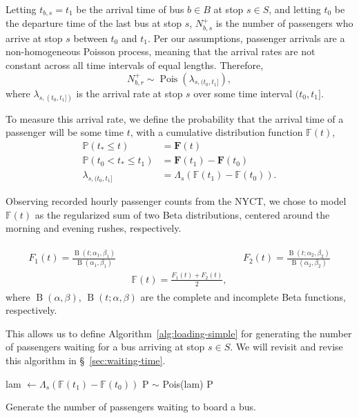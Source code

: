 \documentclass[12pt]{article}
\theoremstyle{definition}
\newcommand{\Prob}{\mathbb P}
\DeclareMathOperator{\Pois}{Pois}
\DeclareMathOperator{\B}{B}
\begin{document}
Letting $t_{b,s} = t_1$ be the arrival time of bus $b \in B$ at stop $s \in
S$, and letting $t_0$ be the departure time of the last bus at stop $s$,
$N^+_{b,s}$ is the number of passengers who arrive at stop $s$ between $t_0$
and $t_1$. Per our assumptions, passenger arrivals are a non-homogeneous
Poisson process, meaning that the arrival rates are not constant across all
time intervals of equal lengths. Therefore,
\[
    N^+_{b,r} \sim \Pois\left(\lambda_{s, (t_0, t_1]}\right),
\]
where $\lambda_{s, \left(t_0, t_1]\right)}$
is the arrival rate at stop $s$ over some time interval $(t_0, t_1]$.

To measure this arrival rate, we define the probability that the arrival time of a
passenger will be some time $t$, with a cumulative distribution function
$\mathbb F(t)$,
\begin{align*}
    \Prob(t_* \le t) &= \mathbf F(t)\\
    \Prob(t_0 < t_* \le t_1) &= \mathbf F(t_1) - \mathbf F(t_0)\\
    \lambda_{s, (t_0, t_1]} &= \Lambda_s\left(\mathbb F(t_1) - \mathbb
        F(t_0)\right).
\end{align*}

Observing recorded hourly passenger counts from the NYCT, we chose to model
$\mathbb F(t)$ as the regularized sum of two Beta distributions, centered
around the morning and evening rushes, respectively.

\begin{gather*}
    \begin{aligned}
    &F_1(t) = \frac{\B(t; \alpha_1, \beta_1)}{\B(\alpha_1, \beta_1)}&
    &&
    &F_2(t) = \frac{\B(t; \alpha_2, \beta_2)}{\B(\alpha_2, \beta_2)}&\\
    &&&\mathbb F(t) = \frac{F_1(t) + F_2(t)}{2},&
    \end{aligned}
\end{gather*}
where $\B(\alpha, \beta)$, $\B(t; \alpha, \beta)$ are the complete and
incomplete Beta functions, respectively.

This allows us to define Algorithm~\ref{alg:loading-simple} for generating the
number of passengers waiting for a bus arriving at stop $s \in S$. We will
revisit and revise this algorithm in \S~\ref{sec:waiting-time}.
\begin{algorithm}
    \begin{algorithmic}
        \State lam $\gets \Lambda_s(\mathbb F(t_1) - \mathbb F(t_0))$
        \State \Generate P $\sim$ Pois(lam)
        \State \Return P
        \EndFunction
    \end{algorithmic}
    \caption{Generate the number of passengers waiting to board a bus.}
    \label{alg:loading-simple}
\end{algorithm}
\end{document}
